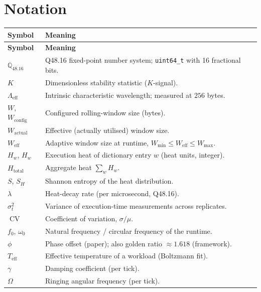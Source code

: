 \documentclass[11pt,letterpaper,openany]{book}
\theoremstyle{definition}
\theoremstyle{plain}
\newcommand{\Qfp}{\mathbb{Q}_{48.16}}                %
\newcommand{\Lambdaeff}{\Lambda_{\mathrm{eff}}}
\newcommand{\Wact}{W_{\mathrm{actual}}}
\newcommand{\Wcfg}{W_{\mathrm{config}}}
\newcommand{\Weff}{W_{\mathrm{eff}}}
\newcommand{\Wmax}{W_{\mathrm{max}}}
\newcommand{\Wmin}{W_{\mathrm{min}}}
\newcommand{\Teff}{T_{\mathrm{eff}}}
\newcommand{\CV}{\operatorname{CV}}
\newcommand{\heat}{H}
\begin{document}
\tableofcontents
\clearpage

\chapter*{Notation}
\label{ch:notation}

\begin{longtable}{@{}p{}p{}@{}}
\toprule
\textbf{Symbol} & \textbf{Meaning} \\
\midrule
\endfirsthead
\toprule \textbf{Symbol} & \textbf{Meaning} \\ \midrule \endhead
$\Qfp$            & Q48.16 fixed-point number system; \texttt{uint64\_t} with 16 fractional bits. \\
$K$               & Dimensionless stability statistic ($K$-signal). \\
$\Lambdaeff$      & Intrinsic characteristic wavelength; measured at $256$ bytes. \\
$W$, $\Wcfg$      & Configured rolling-window size (bytes). \\
$\Wact$           & Effective (actually utilised) window size. \\
$\Weff$           & Adaptive window size at runtime, $\Wmin \le \Weff \le \Wmax$. \\
$\heat_w$, $H_w$  & Execution heat of dictionary entry $w$ (heat units, integer). \\
$H_{\mathrm{total}}$ & Aggregate heat $\sum_w H_w$. \\
$S$, $S_H$        & Shannon entropy of the heat distribution. \\
$\lambda$         & Heat-decay rate (per microsecond, Q48.16). \\
$\sigma_t^2$      & Variance of execution-time measurements across replicates. \\
$\CV$             & Coefficient of variation, $\sigma/\mu$. \\
$f_0$, $\omega_0$ & Natural frequency / circular frequency of the runtime. \\
$\phi$            & Phase offset (paper); also golden ratio $\approx 1.618$ (framework). \\
$\Teff$           & Effective temperature of a workload (Boltzmann fit). \\
$\gamma$          & Damping coefficient (per tick). \\
$\Omega$          & Ringing angular frequency (per tick). \\

\end{longtable}
\end{document}
